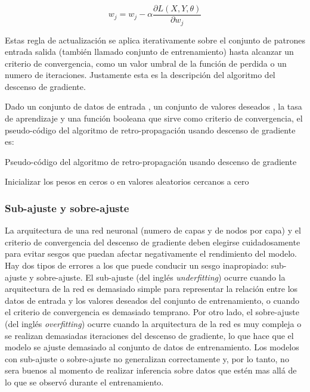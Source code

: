\begin{equation}
    \label{eq:gd-update-rule-item}
    w_{j} = w_{j} - \alpha \frac{\partial L(X, Y, \theta)}{\partial w_{j}}
\end{equation}

Estas regla de actualización se aplica iterativamente sobre el conjunto de patrones entrada salida (también llamado conjunto de entrenamiento) hasta alcanzar un criterio de convergencia, como un valor umbral de la función de perdida o un numero de iteraciones. Justamente esta es la descripción del algoritmo del descenso de gradiente.

Dado un conjunto de datos de entrada , un conjunto de valores deseados , la tasa de aprendizaje \jim{\alpha} y una función booleana  que sirve como criterio de convergencia, el pseudo-código del algoritmo de retro-propagación usando descenso de gradiente es:

\begin{algorithm}
\label{alg:dg}
\caption{Pseudo-código del algoritmo de retro-propagación usando descenso de gradiente}
\KwResult{\jim{\theta}}

Inicializar los pesos \jim{\theta} en ceros o en valores aleatorios cercanos a cero

\end{algorithm}

\subsubsection{Sub-ajuste y sobre-ajuste}

La arquitectura de una red neuronal (numero de capas y de nodos por capa) y el criterio de convergencia del descenso de gradiente deben elegirse cuidadosamente para evitar sesgos que puedan afectar negativamente el rendimiento del modelo. Hay dos tipos de errores a los que puede conducir un sesgo inapropiado: sub-ajuste y sobre-ajuste. El sub-ajuste (del inglés \textit{underfitting}) ocurre cuando la arquitectura de la red es demasiado simple para representar la relación entre los datos de entrada y los valores deseados del conjunto de entrenamiento, o cuando el criterio de convergencia es demasiado temprano. Por otro lado, el sobre-ajuste (del inglés \textit{overfitting}) ocurre cuando la arquitectura de la red es muy compleja o se realizan demasiadas iteraciones del descenso de gradiente, lo que hace que el modelo se ajuste demasiado al conjunto de datos de entrenamiento. Los modelos con sub-ajuste o sobre-ajuste no generalizan correctamente y, por lo tanto, no sera buenos al momento de realizar inferencia sobre datos que estén mas allá de lo que se observó durante el entrenamiento.

